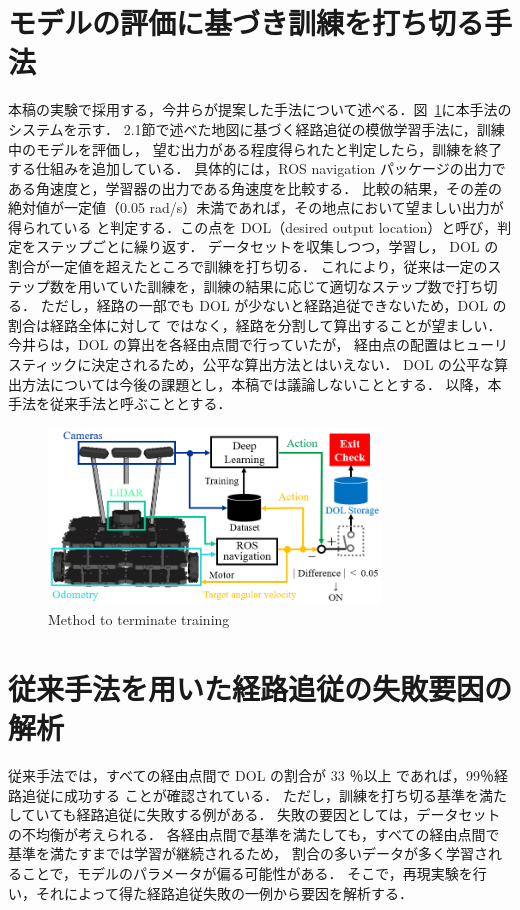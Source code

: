 \documentclass{jarticle}
\renewcommand{\figurename}{図~}
\newcommand{\figref}[1]{\figurename\ref{#1}}
\begin{document}
\section{モデルの評価に基づき訓練を打ち切る手法}
本稿の実験で採用する，今井らが提案した手法について述べる．\figref{fig:5}に本手法のシステムを示す．
2.1節で述べた地図に基づく経路追従の模倣学習手法に，訓練中のモデルを評価し，
望む出力がある程度得られたと判定したら，訓練を終了する仕組みを追加している．
具体的には，ROS navigation パッケージの出力である角速度と，学習器の出力である角速度を比較する．
比較の結果，その差の絶対値が一定値（0.05 rad/s）未満であれば，その地点において望ましい出力が得られている
と判定する．この点を DOL（desired output location）と呼び，判定をステップごとに繰り返す．
データセットを収集しつつ，学習し， DOL の割合が一定値を超えたところで訓練を打ち切る．
これにより，従来は一定のステップ数を用いていた訓練を，訓練の結果に応じて適切なステップ数で打ち切る．
ただし，経路の一部でも DOL が少ないと経路追従できないため，DOL の割合は経路全体に対して
ではなく，経路を分割して算出することが望ましい．今井らは，DOL の算出を各経由点間で行っていたが，
経由点の配置はヒューリスティックに決定されるため，公平な算出方法とはいえない．
DOL の公平な算出方法については今後の課題とし，本稿では議論しないこととする．
以降，本手法を従来手法と呼ぶこととする．

\begin{figure}[h!]
  \centering
   \includegraphics[height=47mm]{./png/moderu.png}
   \caption{Method to terminate training}
   \label{fig:5}
\end{figure}

\newpage

\section{従来手法を用いた経路追従の失敗要因の解析}
従来手法では，すべての経由点間で DOL の割合が 33 ％以上 であれば，99％経路追従に成功する
ことが確認されている\cite{imai2}．
ただし，訓練を打ち切る基準を満たしていても経路追従に失敗する例がある．
失敗の要因としては，データセットの不均衡が考えられる．
各経由点間で基準を満たしても，すべての経由点間で基準を満たすまでは学習が継続されるため，
割合の多いデータが多く学習されることで，モデルのパラメータが偏る可能性がある．
そこで，再現実験を行い，それによって得た経路追従失敗の一例から要因を解析する．
\end{document}
